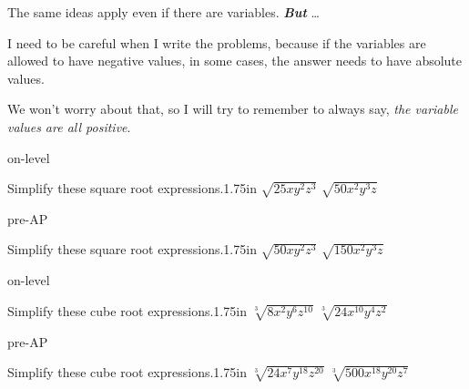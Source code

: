 
    The same ideas apply even if there are variables. {\bfseries\itshape But }\dots

    I need to be careful when I write the problems,
    because if the variables are allowed to have negative values,
    in some cases, the answer needs to have absolute values.

    We won't worry about that, so I will try to remember to always say,
    \textit{the variable values are all positive}.

\begin{taggedblock}{on-level}
    \begin{myProblems2}{Simplify these square root expressions.}{1.75in}
        {
            $\sqrt{25xy^2z^3}$ 
        }
        {
            $\sqrt{50x^2y^3z}$ 
        }
    \end{myProblems2}
\end{taggedblock}
\begin{taggedblock}{pre-AP}
    \begin{myProblems2}{Simplify these square root expressions.}{1.75in}
        {
            $\sqrt{50xy^2z^3}$ 
        }
        {
            $\sqrt{150x^2y^3z}$ 
        }
    \end{myProblems2}
\end{taggedblock}


\begin{taggedblock}{on-level}
    \begin{myProblems2}{Simplify these cube root expressions.}{1.75in}
        {
            $\sqrt[3]{8x^2y^6z^{10}}$ 
        }
        {
            $\sqrt[3]{24x^{10}y^4z^2}$ 
        }
    \end{myProblems2}
\end{taggedblock}
\begin{taggedblock}{pre-AP}
    \begin{myProblems2}{Simplify these cube root expressions.}{1.75in}
        {
            $\sqrt[3]{24x^7y^{18}z^{20}}$ 
        }
        {
            $\sqrt[3]{500x^{18}y^{20}z^7}$ 
        }
    \end{myProblems2}
\end{taggedblock}

